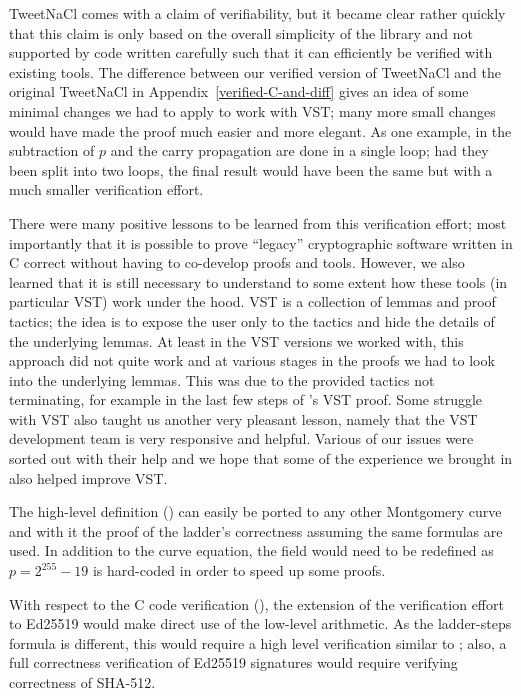 TweetNaCl comes with a claim of verifiability, but it became clear
rather quickly that this claim is only based on the overall simplicity
of the library and not supported by code written carefully such that it can
efficiently be verified with existing tools. The difference between
our verified version of TweetNaCl and the original TweetNaCl in
Appendix~\ref{verified-C-and-diff} gives an idea of some minimal
changes we had to apply to work with VST; many more small changes
would have made the proof much easier and more elegant. As one
example, in  the subtraction of $p$ and the carry
propagation are done in a single  loop;
had they been split into two loops, the final result would have been the same 
but with a much smaller verification effort.

There were many positive lessons to be learned from this verification effort;
most importantly that it is possible to prove ``legacy'' cryptographic
software written in C correct without having to co-develop proofs
and tools. However, we also learned that it is still necessary to
understand to some extent how these tools (in particular VST)
work under the hood.
VST is a collection of lemmas and proof tactics; the idea is
to expose the user only to the tactics and hide the details of
the underlying lemmas.
At least in the VST versions we worked with,
this approach did not quite work and at various stages in
the proofs we had to look into the underlying lemmas.
This was due to the provided tactics not terminating,
for example in the last few steps of 's VST proof.
Some struggle with VST also taught us another very pleasant lesson,
namely that the VST development team is very responsive and helpful.
Various of our issues were sorted out with their help and we hope
that some of the experience we brought in also helped improve VST.

The high-level definition () can easily be ported to any
other Montgomery curve and with it the proof of the ladder's correctness
assuming the same formulas are used.
In addition to the curve equation, the field  would need to be redefined
as $p=2^{255}-19$ is hard-coded in order to speed up some proofs.

With respect to the C code verification (), the extension of
the verification effort to Ed25519 would make direct use of the low-level
arithmetic. As the ladder-steps formula is different, this would require a high
level verification similar to ;
also, a full correctness verification of Ed25519 signatures would require
verifying correctness of SHA-512.

